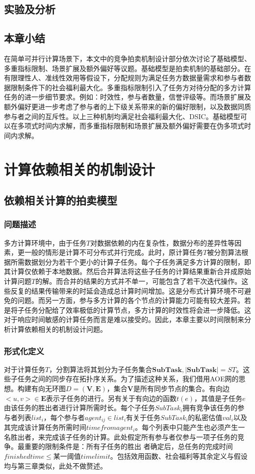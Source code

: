 \documentclass[promaster]{thesis-uestc}
\begin{document}
\section{实验及分析}

\section{本章小结}
在简单可并行计算场景下，本文中的竞争拍卖机制设计部分依次讨论了基础模型、多重指标限制、场景扩展及额外偏好等议题。基础模型是拍卖机制的基础部分。在有限理性人、准线性效用等假设下，分配规则为满足任务方数据量需求和参与者数据限制条件下的社会福利最大化。多重指标限制引入了任务方对待分配的多方计算任务的进一步细节要求。例如：时效性，参与者数量，信誉评级等。而场景扩展及额外偏好更进一步考虑了参与者的上下级关系带来的新的偏好限制，以及数据同质参与者之间的互斥性。以上三种机制均满足社会福利最大化、DSIC。基础模型可以在多项式时间内求解，而多重指标限制和场景扩展及额外偏好需要在伪多项式时间内求解。

\chapter{计算依赖相关的机制设计}
\section{依赖相关计算的拍卖模型}
\subsection{问题描述}
多方计算环境中，由于任务$T$对数据依赖的内在复杂性，数据分布的差异性等因素，更一般的情形是计算不可分布式并行完成。此时，原计算任务$T$被分割算法根据所需数据划分为若干个更小的计算子任务。每个子任务满足多方计算的限制，即其计算仅依赖于本地数据。然后合并算法将这些子任务的计算结果重新合并成原始计算问题$T$的解。而合并的结果的方式并不单一，可能包含了若干次迭代操作。这些反复的结果传输带来的时延会造成总计算时间增加。这是分布式计算环境不可避免的问题。而另一方面，参与多方计算的各个节点的计算能力可能有较大差异。若是将子任务分配给了效率极低的计算节点，多方计算的时效性将会进一步降低。这对于响应时间敏感的计算任务而言是难以接受的。因此，本章主要以时间限制来分析计算依赖相关的机制设计问题。

\subsection{形式化定义}
对于计算任务$T$，分割算法将其划分为子任务集合$\mathbf{SubTask},|\mathbf{SubTask}| = ST$。这些子任务之间的同步存在拓扑序关系。为了描述这种关系，我们借用AOE网的思想。构建有向无环图$D=(\mathbf{V},\mathbf{E})$，集合$\mathbf{V}$是所有同步节点的集合。有向边$<u,v> \in \mathbf{E}$表示子任务的进行。另有关于有向边的函数$t(e)$，其值是子任务$e$由该任务的胜出者进行计算所需时长。每个子任务$SubTask_i$拥有竞争该任务的参与者列表$list_i$，每个参与者$agent_{ij} \in list_i$有关于任务$SubTask_i$的私密估值$val_i$以及其完成该计算任务所需时间$timefromagent_i$。每个列表中只能产生也必须产生一名胜出者，来完成该子任务的计算。此处假定所有参与者仅参与一项子任务的竞争。最重要的限制条件是：所有子任务的胜出
者确定后，总任务的完成时间$finishedtime \leq $某一阈值$timelimit$。包括效用函数、社会福利等其余定义与假设均与第三章类似，此处不做赘述。
\end{document}
